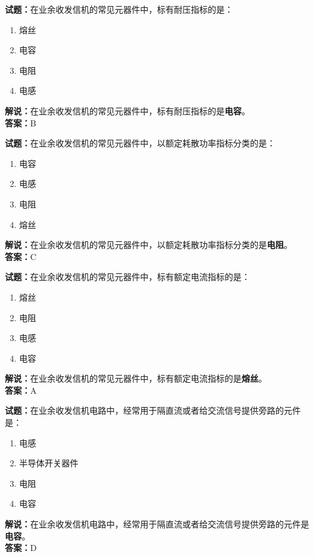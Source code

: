 \documentclass{ctexbook}
\begin{document}
\vspace{1em}

\textbf{试题：}在业余收发信机的常见元器件中，标有耐压指标的是：
\begin{enumerate}[leftmargin=3em]
  \item 熔丝
  \item 电容
  \item 电阻
  \item 电感
\end{enumerate}
\noindent\textbf{解说：}在业余收发信机的常见元器件中，标有耐压指标的是\textbf{电容}。\\\noindent\textbf{答案：}B

\vspace{1em}

\textbf{试题：}在业余收发信机的常见元器件中，以额定耗散功率指标分类的是：
\begin{enumerate}[leftmargin=3em]
  \item 电容
  \item 电感
  \item 电阻
  \item 熔丝
\end{enumerate}
\noindent\textbf{解说：}在业余收发信机的常见元器件中，以额定耗散功率指标分类的是\textbf{电阻}。\\\noindent\textbf{答案：}C

\vspace{1em}

\textbf{试题：}在业余收发信机的常见元器件中，标有额定电流指标的是：
\begin{enumerate}[leftmargin=3em]
  \item 熔丝
  \item 电阻
  \item 电感
  \item 电容
\end{enumerate}
\noindent\textbf{解说：}在业余收发信机的常见元器件中，标有额定电流指标的是\textbf{熔丝}。\\\noindent\textbf{答案：}A

\vspace{1em}

\textbf{试题：}在业余收发信机电路中，经常用于隔直流或者给交流信号提供旁路的元件是：
\begin{enumerate}[leftmargin=3em]
  \item 电感
  \item 半导体开关器件
  \item 电阻
  \item 电容
\end{enumerate}
\noindent\textbf{解说：}在业余收发信机电路中，经常用于隔直流或者给交流信号提供旁路的元件是\textbf{电容}。\\\noindent\textbf{答案：}D
\end{document}
